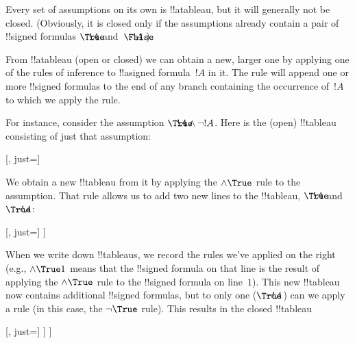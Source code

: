 \documentclass[../../../include/open-logic-section]{subfiles}
\begin{document}
\begin{ex}
  Every set of assumptions on its own is !!a{tableau}, but it will
  generally not be closed. (Obviously, it is closed only if the
  assumptions already contain a pair of !!{signed formula}s
  $\sFmla{\True}{!A}$ and~$\sFmla{\False}{!A}$.)

  From !!a{tableau} (open or closed) we can obtain a new, larger one by
  applying one of the rules of inference to !!a{signed formula}~$!A$
  in it. The rule will append one or more !!{signed formula}s to the end of
  any branch containing the occurrence of~$!A$ to which we apply the
  rule.

  For instance, consider the assumption $\sFmla{\True}{!A \land \lnot
    !A}$. Here is the (open) !!{tableau} consisting of just that
  assumption:
  \begin{center}
    \begin{tableau}{}
      [, just=\TAss]
    \end{tableau}{}
  \end{center}
  We obtain a new !!{tableau} from it by applying the $\TRule{\True}{\land}$
  rule to the assumption. That rule allows us to add two new lines to
  the !!{tableau}, $\sFmla{\True}{!A}$ and $\sFmla{\True}{\lnot !A}$:
  \begin{center}
    \begin{tableau}{}
      [, just=\TAss
        [\sFmla{\True}{\formula{A}}, just={\TRule{\True}{\land}[1]},
          [\sFmla{\True}{\lnot \formula{A}}, just={\TRule{\True}{\land}[1]}
          ]
        ]
      ]
    \end{tableau}{}
  \end{center}
  When we write down !!{tableau}s, we record the rules we've applied
  on the right (e.g., $\TRule{\True}{\land} 1$ means that the
  !!{signed formula} on that line is the result of applying the
  $\TRule{\True}{\land}$ rule to the !!{signed formula} on line~$1$).
  This new !!{tableau} now contains additional !!{signed formula}s,
  but to only one ($\sFmla{\True}{\lnot !A}$) can we apply a rule (in
  this case, the $\TRule{\True}{\lnot}$ rule). This results in the closed
  !!{tableau}
  \begin{center}
    \begin{tableau}{}
      [, just=\TAss
        [\sFmla{\True}{\formula{A}}, just={\TRule{\True}{\land}[1]}
          [\sFmla{\True}{\lnot \formula{A}}, just={\TRule{\True}{\land}[1]}
            [\sFmla{\False}{\formula{A}}, just={\TRule{\True}{\lnot}[3]}, close]
          ]
        ]
      ]
    \end{tableau}{}
  \end{center}
\end{ex}
\end{document}
